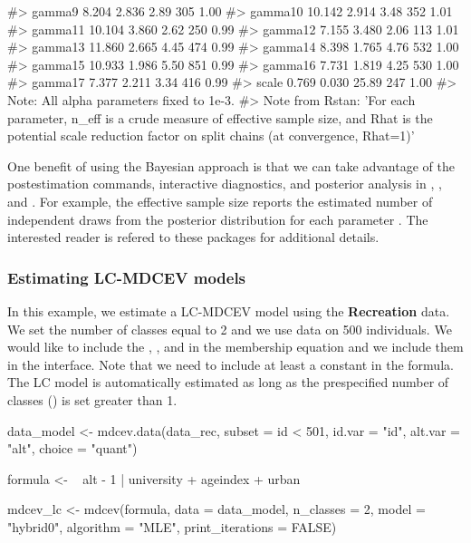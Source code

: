 \begin{Schunk}
\begin{Soutput}
#> gamma9                8.204   2.836   2.89   305 1.00
#> gamma10              10.142   2.914   3.48   352 1.01
#> gamma11              10.104   3.860   2.62   250 0.99
#> gamma12               7.155   3.480   2.06   113 1.01
#> gamma13              11.860   2.665   4.45   474 0.99
#> gamma14               8.398   1.765   4.76   532 1.00
#> gamma15              10.933   1.986   5.50   851 0.99
#> gamma16               7.731   1.819   4.25   530 1.00
#> gamma17               7.377   2.211   3.34   416 0.99
#> scale                 0.769   0.030  25.89   247 1.00
#> Note: All alpha parameters fixed to 1e-3. 
#> Note from Rstan: 'For each parameter, n_eff is a crude measure of effective sample size, and Rhat is the potential scale reduction factor on split chains (at convergence, Rhat=1)'
\end{Soutput}
\end{Schunk}

One benefit of using the Bayesian approach is that we can take advantage
of the postestimation commands, interactive diagnostics, and posterior
analysis in ,
\href{https://mc-stan.org/bayesplot/}{}
\citep{gabrybayesplot2019}, and
\href{http://mc-stan.org/shinystan/}{}
\citep{muthuser2018}. For example, the effective sample size reports the
estimated number of independent draws from the posterior distribution
for each parameter \citep{stan2019}. The interested reader is refered to
these packages for additional details.

\hypertarget{estimating-lc-mdcev-models}{%
\subsubsection{Estimating LC-MDCEV
models}\label{estimating-lc-mdcev-models}}

In this example, we estimate a LC-MDCEV model using the
\textbf{Recreation} data. We set the number of classes equal to 2 and we
use data on 500 individuals. We would like to include the
, , and  in the membership
equation and we include them in the  interface. Note that
we need to include at least a constant in the formula. The LC model is
automatically estimated as long as the prespecified number of classes
() is set greater than 1.

\begin{Schunk}
\begin{Sinput}
data_model <- mdcev.data(data_rec, subset = id < 501,
                       id.var = "id",
                       alt.var = "alt",
                       choice = "quant")  

formula <- ~ alt - 1 | university + ageindex + urban

mdcev_lc <- mdcev(formula,
                  data = data_model,
                  n_classes = 2,
                  model = "hybrid0",
                  algorithm = "MLE",
                  print_iterations = FALSE)
\end{Sinput}
\end{Schunk}

